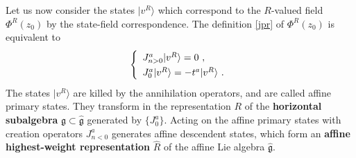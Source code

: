 \documentclass[12pt,a4paper,notitlepage]{report}
\numberwithin{equation}{section}
\theoremstyle{break}
\begin{document}
Let us now consider the states $|v^R\rangle$ which correspond to the $R$-valued field $\Phi^R(z_0)$ by the state-field correspondence.
The definition \eqref{jpr} of $\Phi^R(z_0)$ is equivalent to 
\begin{align}
\renewcommand{\arraystretch}{1.3}
 \left\{\begin{array}{l}  J^a_{n>0}|v^R\rangle = 0 \ ,  \\ J^a_0|v^R\rangle = -t^a |v^R\rangle\ . \end{array}\right. 
\end{align}
The states $|v^R\rangle$ are killed by the annihilation operators, and are called affine primary states.
They transform in the representation $R$ of the \textbf{\boldmath horizontal subalgebra} $\mathfrak{g}\subset \hat{\mathfrak{g}}$ generated by $\{J^a_0\}$.
Acting on the affine primary states with creation operators $J^a_{n<0}$ generates affine descendent states, which form an \textbf{\boldmath affine highest-weight representation} $\hat{R}$ of the affine Lie algebra $\hat{\mathfrak{g}}$.
\end{document}
